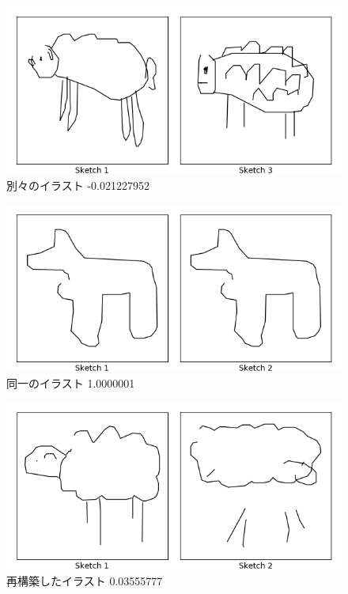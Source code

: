 \documentclass[onecolumn]{ujarticle}   %
\begin{document}
\begin{figure}[th]
  \begin{center}
    \includegraphics[clip,width=140mm]{compare2.png}
    \caption{別々のイラスト -0.021227952}
    \label{fig:result2}
  \end{center}
\end{figure}

\begin{figure}[th]
  \begin{center}
    \includegraphics[clip,width=140mm]{compare3.png}
    \caption{同一のイラスト 1.0000001}
    \label{fig:result3}
  \end{center}
\end{figure}

\begin{figure}[th]
  \begin{center}
    \includegraphics[clip,width=140mm]{compare4.png}
    \caption{再構築したイラスト 0.03555777}
    \label{fig:result4}
  \end{center}
\end{figure}






% 
% 
\end{document}
